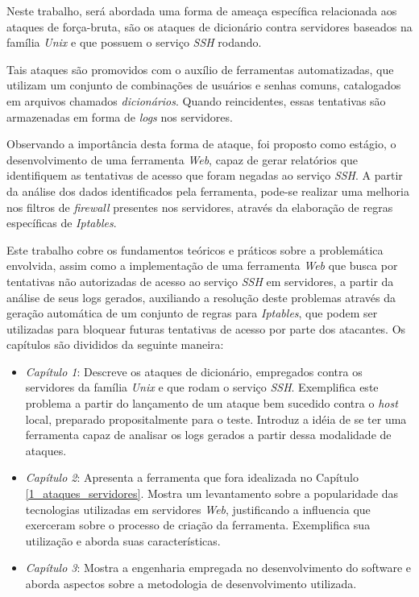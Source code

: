 Neste trabalho, será abordada uma forma de ameaça específica relacionada aos ataques de força-bruta, são os ataques de dicionário contra servidores baseados na família \textit{Unix} e que possuem o serviço \textit{SSH} rodando.

Tais ataques são promovidos com o auxílio de ferramentas automatizadas, que utilizam um conjunto de combinações de usuários e senhas comuns, catalogados em arquivos chamados  \textit{dicionários}. Quando reincidentes, essas tentativas são armazenadas em forma de \textit{logs} nos servidores.

Observando a importância desta forma de ataque, foi proposto como estágio, o desenvolvimento de uma ferramenta \textit{Web}, capaz de gerar relatórios que identifiquem as tentativas de acesso que foram negadas ao serviço \textit{SSH}. A partir da análise dos dados identificados pela ferramenta, pode-se realizar uma melhoria nos filtros de \textit{firewall} presentes nos servidores, através da elaboração de regras específicas de \textit{Iptables}.

Este trabalho cobre os fundamentos teóricos e práticos sobre a problemática envolvida, assim como a implementação de uma ferramenta \textit{Web} que busca por tentativas não autorizadas de acesso ao serviço \textit{SSH} em servidores, a partir da análise de seus logs gerados, auxiliando a resolução deste problemas através da geração automática de um conjunto de regras para \textit{Iptables}, que podem ser utilizadas para bloquear futuras tentativas de acesso por parte dos atacantes. Os capítulos são divididos da seguinte maneira:

\begin{itemize}
    \item \textit{Capítulo 1}: Descreve os ataques de dicionário, empregados contra os servidores da família \textit{Unix} e que rodam o serviço \textit{SSH}. Exemplifica este problema a partir do lançamento de um ataque bem sucedido contra o \textit{host} local, preparado propositalmente para o teste. Introduz a idéia de se ter uma ferramenta capaz de analisar os logs gerados a partir dessa modalidade de ataques.
    \item \textit{Capítulo 2}: Apresenta a ferramenta que fora idealizada no Capítulo \ref{1_ataques_servidores}. Mostra um levantamento sobre a popularidade das tecnologias utilizadas em servidores \textit{Web}, justificando a influencia que exerceram sobre o processo de criação da ferramenta. Exemplifica sua utilização e aborda suas características.
    \item \textit{Capítulo 3}: Mostra a engenharia empregada no desenvolvimento do software e aborda aspectos sobre a metodologia de desenvolvimento utilizada.
\end{itemize}

